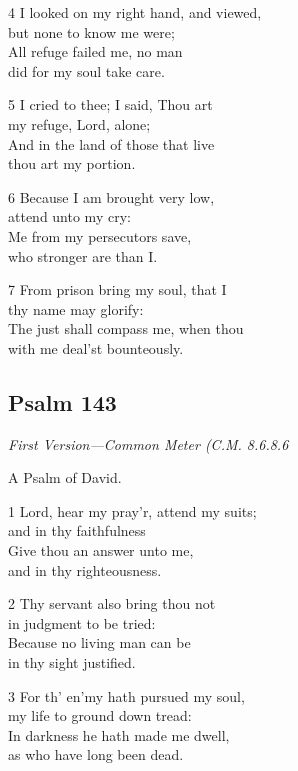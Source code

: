 4 I looked on my right hand, and viewed,\\
but none to know me were;\\
All refuge failed me, no man\\
did for my soul take care.

5 I cried to thee; I said, Thou art\\
my refuge, Lord, alone;\\
And in the land of those that live\\
thou art my portion.

6 Because I am brought very low,\\
attend unto my cry:\\
Me from my persecutors save,\\
who stronger are than I.

7 From prison bring my soul, that I\\
thy name may glorify:\\
The just shall compass me, when thou\\
with me deal’st bounteously.

\begin{center}
\quad{}\quad{}
\end{center}

\subsection*{Psalm 143}

\emph{First Version---Common Meter (C.M. 8.6.8.6}

A Psalm of David.

1 Lord, hear my pray’r, attend my suits;\\
and in thy faithfulness\\
Give thou an answer unto me,\\
and in thy righteousness.

2 Thy servant also bring thou not\\
in judgment to be tried:\\
Because no living man can be\\
in thy sight justified.

3 For th’ en’my hath pursued my soul,\\
my life to ground down tread:\\
In darkness he hath made me dwell,\\
as who have long been dead.

